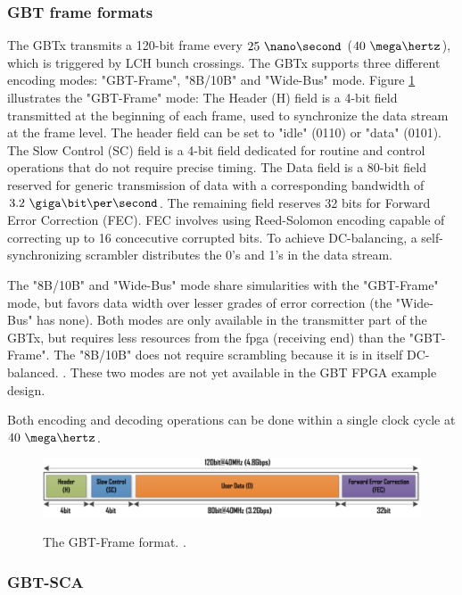 \documentclass[main.tex]{subfiles}
\begin{document}
\subsubsection{GBT frame formats}
 The GBTx transmits a 120-bit frame every $25~\nano\second$ ($40~\mega\hertz$), which is triggered by LCH bunch crossings. The GBTx supports three different encoding modes: "GBT-Frame", "8B/10B" and "Wide-Bus" mode. Figure \ref{fig:gbtframe} illustrates the "GBT-Frame" mode: The Header (H) field is a 4-bit field transmitted at the beginning of each frame, used to synchronize the data stream at the frame level. The header field can be set to "idle" (0110) or "data" (0101). The Slow Control (SC) field is a 4-bit field dedicated for routine and control operations that do not require precise timing. The Data field is a 80-bit field reserved for generic transmission of data with a corresponding bandwidth of $3.2~\giga\bit\per\second$. The remaining field reserves 32 bits for Forward Error Correction (FEC). FEC involves using Reed-Solomon encoding capable of correcting up to 16 concecutive corrupted bits. To achieve DC-balancing, a self-synchronizing scrambler distributes the 0's and 1's in the data stream.

The "8B/10B" and "Wide-Bus" mode share simularities with the "GBT-Frame" mode, but favors data width over lesser grades of error correction (the "Wide-Bus" has none). Both modes are only available in the transmitter part of the GBTx, but requires less resources from the \gls{fpga} (receiving end) than the "GBT-Frame". The "8B/10B" does not require scrambling because it is in itself DC-balanced. \cite{gbtxman11}. These two modes are not yet available in the GBT FPGA example design.

 Both encoding and decoding operations can be done within a single clock cycle at $40~\mega\hertz$. 
 
\begin{figure} %
\includegraphics[width=\linewidth]{../img/gbtframe}  \\[0.1 cm]
\caption{The GBT-Frame format. \cite[Figure 4]{gbt_fpga}.}
\label{fig:gbtframe}
\end{figure}

\subsubsection{GBT-SCA}
\end{document}
